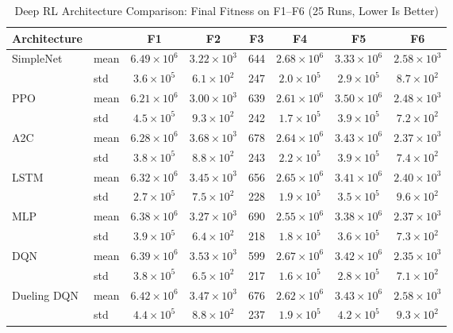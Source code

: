 \documentclass[conference]{IEEEtran}
\begin{document}
\begin{table}[htbp]
\centering
\scriptsize
\caption{Deep RL Architecture Comparison: Final Fitness on F1--F6 (25 Runs, Lower Is Better)}
\label{tab:deeprl}
\begin{tabular}{llcccccc}
\toprule
\textbf{Architecture} & & F1 & F2 & F3 & F4 & F5 & F6 \\
\midrule
SimpleNet & mean & $6.49 \times 10^6$ & $3.22 \times 10^3$ & 644 & $2.68 \times 10^6$ & $3.33 \times 10^6$ & $2.58 \times 10^3$ \\
 & std & $3.6 \times 10^5$ & $6.1 \times 10^2$ & 247 & $2.0 \times 10^5$ & $2.9 \times 10^5$ & $8.7 \times 10^2$ \\
PPO & mean & $6.21 \times 10^6$ & $3.00 \times 10^3$ & 639 & $2.61 \times 10^6$ & $3.50 \times 10^6$ & $2.48 \times 10^3$ \\
 & std & $4.5 \times 10^5$ & $9.3 \times 10^2$ & 242 & $1.7 \times 10^5$ & $3.9 \times 10^5$ & $7.2 \times 10^2$ \\
A2C & mean & $6.28 \times 10^6$ & $3.68 \times 10^3$ & 678 & $2.64 \times 10^6$ & $3.43 \times 10^6$ & $2.37 \times 10^3$ \\
 & std & $3.8 \times 10^5$ & $8.8 \times 10^2$ & 243 & $2.2 \times 10^5$ & $3.9 \times 10^5$ & $7.4 \times 10^2$ \\
LSTM & mean & $6.32 \times 10^6$ & $3.45 \times 10^3$ & 656 & $2.65 \times 10^6$ & $3.41 \times 10^6$ & $2.40 \times 10^3$ \\
 & std & $2.7 \times 10^5$ & $7.5 \times 10^2$ & 228 & $1.9 \times 10^5$ & $3.5 \times 10^5$ & $9.6 \times 10^2$ \\
MLP & mean & $6.38 \times 10^6$ & $3.27 \times 10^3$ & 690 & $2.55 \times 10^6$ & $3.38 \times 10^6$ & $2.37 \times 10^3$ \\
 & std & $3.9 \times 10^5$ & $6.4 \times 10^2$ & 218 & $1.8 \times 10^5$ & $3.6 \times 10^5$ & $7.3 \times 10^2$ \\
DQN & mean & $6.39 \times 10^6$ & $3.53 \times 10^3$ & 599 & $2.67 \times 10^6$ & $3.42 \times 10^6$ & $2.35 \times 10^3$ \\
 & std & $3.8 \times 10^5$ & $6.5 \times 10^2$ & 217 & $1.6 \times 10^5$ & $2.8 \times 10^5$ & $7.1 \times 10^2$ \\
Dueling DQN & mean & $6.42 \times 10^6$ & $3.47 \times 10^3$ & 676 & $2.62 \times 10^6$ & $3.43 \times 10^6$ & $2.58 \times 10^3$ \\
 & std & $4.4 \times 10^5$ & $8.8 \times 10^2$ & 237 & $1.9 \times 10^5$ & $4.2 \times 10^5$ & $9.3 \times 10^2$ \\
\bottomrule
\end{tabular}
\end{table}
\end{document}
